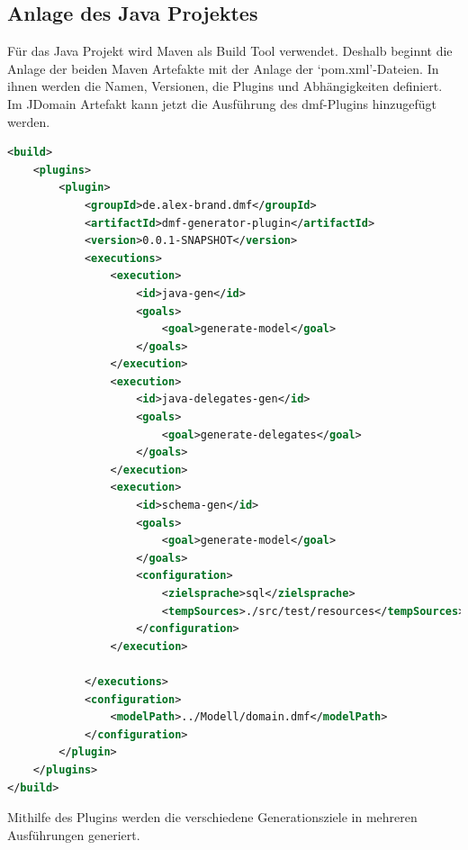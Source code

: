 \documentclass[./einleitung.tex]{subfiles}
\begin{document}
    \subsection{Anlage des Java Projektes}\label{subsec:anlage-des-java-projektes}
    Für das Java Projekt wird Maven als Build Tool verwendet.
    Deshalb beginnt die Anlage der beiden Maven Artefakte mit der Anlage der `pom.xml'-Dateien.
    In ihnen werden die Namen, Versionen, die Plugins und Abhängigkeiten definiert.\\
    Im JDomain Artefakt kann jetzt die Ausführung des \acrshort{dmf}-Plugins hinzugefügt werden.
    \begin{lstlisting}[language=XML, caption=Konfiguration des \acrshort{dmf}-Plugins, label=lst:jdomainPlugins]
<build>
    <plugins>
        <plugin>
            <groupId>de.alex-brand.dmf</groupId>
            <artifactId>dmf-generator-plugin</artifactId>
            <version>0.0.1-SNAPSHOT</version>
            <executions>
                <execution>
                    <id>java-gen</id>
                    <goals>
                        <goal>generate-model</goal>
                    </goals>
                </execution>
                <execution>
                    <id>java-delegates-gen</id>
                    <goals>
                        <goal>generate-delegates</goal>
                    </goals>
                </execution>
                <execution>
                    <id>schema-gen</id>
                    <goals>
                        <goal>generate-model</goal>
                    </goals>
                    <configuration>
                        <zielsprache>sql</zielsprache>
                        <tempSources>./src/test/resources</tempSources>
                    </configuration>
                </execution>

            </executions>
            <configuration>
                <modelPath>../Modell/domain.dmf</modelPath>
            </configuration>
        </plugin>
    </plugins>
</build>
    \end{lstlisting}
    Mithilfe des Plugins werden die verschiedene Generationsziele in mehreren Ausführungen generiert.
    \newpage
\end{document}
